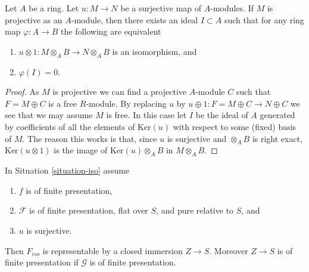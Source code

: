 \begin{lemma}
\label{lemma-flattening-module-map}
Let $A$ be a ring. Let $u : M \to N$ be a surjective map of $A$-modules.
If $M$ is projective as an $A$-module, then there exists an ideal
$I \subset A$ such that for any ring map $\varphi : A \to B$
the following are equivalent
\begin{enumerate}
\item $u \otimes 1 : M \otimes_A B \to N \otimes_A B$ is an
isomorphism, and
\item $\varphi(I) = 0$.
\end{enumerate}
\end{lemma}

\begin{proof}
As $M$ is projective we can find a projective $A$-module $C$
such that $F = M \oplus C$ is a free $R$-module.
By replacing $u$ by $u \oplus 1 : F = M \oplus C \to N \oplus C$
we see that we may assume $M$ is free. In this case let $I$ be
the ideal of $A$ generated by coefficients of all the elements of
$\text{Ker}(u)$ with respect to some (fixed) basis of $M$.
The reason this works is that, since $u$ is surjective and
$\otimes_A B$ is right exact, $\text{Ker}(u \otimes 1)$ is
the image of $\text{Ker}(u) \otimes_A B$ in $M \otimes_A B$.
\end{proof}

\begin{theorem}
\label{theorem-flattening-map}
In
Situation \ref{situation-iso}
assume
\begin{enumerate}
\item $f$ is of finite presentation,
\item $\mathcal{F}$ is of finite presentation, flat over $S$, and
pure relative to $S$, and
\item $u$ is surjective.
\end{enumerate}
Then $F_{iso}$ is representable by a closed immersion $Z \to S$.
Moreover $Z \to S$ is of finite presentation if $\mathcal{G}$ is
of finite presentation.
\end{theorem}

